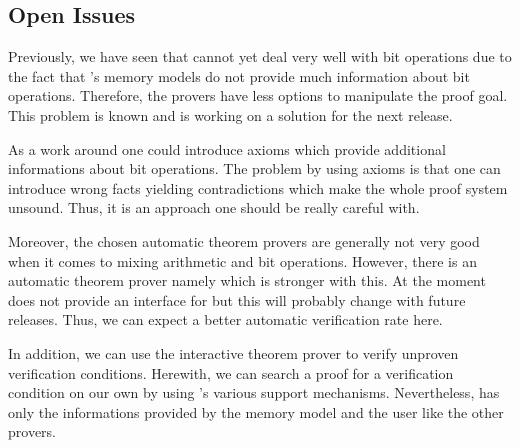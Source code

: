 \clearpage

\subsection{Open Issues}
\label{issues}


Previously, we have seen that \wpframac cannot yet deal very well with bit operations
due to the fact that \wpframac's memory models do not provide 
much information about bit operations.
Therefore, the provers have less options to manipulate the proof goal.
This problem is known and \cealist is working on a solution for the next release.

As a work around one could introduce axioms which provide
additional informations about bit operations. 
The problem by using axioms is that one can introduce wrong facts
yielding contradictions which make the whole proof system unsound. 
Thus, it is an approach one should be really careful with.

Moreover, the chosen automatic theorem provers are generally not very
good when it comes to mixing arithmetic and bit operations.
However, there is an automatic theorem prover namely \z
which is stronger with this. 
At the moment \framac does not provide an interface for \z
but this will probably change with future releases. Thus, we can expect
a better automatic verification rate here.

In addition, we can use the interactive theorem prover \coq to verify 
unproven verification conditions.
Herewith, we can search a proof for a verification condition
on our own by using \coq's various support mechanisms.
Nevertheless, \coq has only the informations provided by the memory
model and the user like the other provers.
